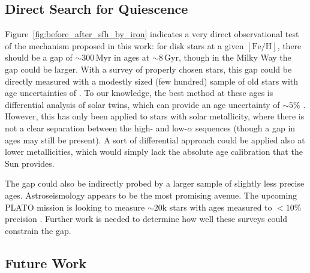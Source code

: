 \documentclass[twocolumn,linenumbers,trackchanges]{aastex631}
\newcommand{\Gyr}{\ensuremath{\textrm{Gyr}}}
\newcommand{\Myr}{\ensuremath{\textrm{Myr}}}
\newcommand{\FeH}{\ensuremath{[\textrm{Fe}/\textrm{H}]}}
\begin{document}
\subsection{Direct Search for Quiescence}\label{ssec:obsqui}
Figure~\ref{fig:before_after_sfh_by_iron} indicates a very direct observational test of the mechanism proposed in this work: for disk stars at a given \FeH{}, there should be a gap of $\sim300\,\Myr$ in ages at $\sim8\,\Gyr$, though in the Milky Way the gap could be larger. With a survey of properly chosen stars, this gap could be directly measured with a modestly sized (few hundred) sample of old stars with age uncertainties of . To our knowledge, the best method at these ages is differential analysis of solar twins, which can provide an age uncertainty of $\sim5\%$ \citep[e.g.][]{2014ApJ...795...23B,2018MNRAS.474.2580S}. However, this has only been applied to stars with solar metallicity, where there is not a clear separation between the high- and low-$\alpha$ sequences (though a gap in ages may still be present). A sort of differential approach could be applied also at lower metallicities, which would simply lack the absolute age calibration that the Sun provides.

The gap could also be indirectly probed by a larger sample of slightly less precise ages. Astroseismology appears to be the most promising avenue.  The upcoming PLATO mission is looking to measure $\sim20\textrm{k}$ stars with ages measured to $<10\%$ precision \citep{2024arXiv240605447R}. Further work is needed to determine how well these surveys could constrain the gap.

\subsection{Future Work}\label{ssec:future_work}
\end{document}
